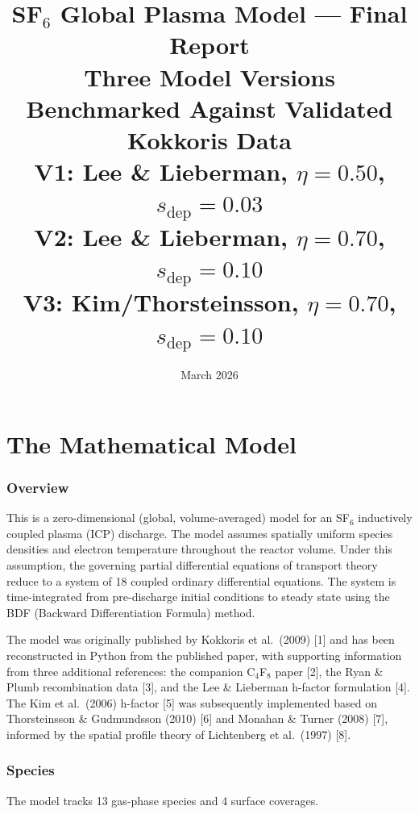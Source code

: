 \documentclass[11pt,a4paper]{article}
\title{\textbf{SF$_6$ Global Plasma Model --- Final Report}\\[6pt]
\large Three Model Versions Benchmarked Against Validated Kokkoris Data\\[4pt]
\normalsize V1: Lee \& Lieberman, $\eta=0.50$, $s_\text{dep}=0.03$\\
V2: Lee \& Lieberman, $\eta=0.70$, $s_\text{dep}=0.10$\\
V3: Kim/Thorsteinsson, $\eta=0.70$, $s_\text{dep}=0.10$}
\date{March 2026}
\begin{document}
\maketitle
\tableofcontents
\newpage

\part{The Mathematical Model}

\section{Overview}

This is a zero-dimensional (global, volume-averaged) model for an SF$_6$ inductively coupled plasma (ICP) discharge. The model assumes spatially uniform species densities and electron temperature throughout the reactor volume. Under this assumption, the governing partial differential equations of transport theory reduce to a system of 18 coupled ordinary differential equations. The system is time-integrated from pre-discharge initial conditions to steady state using the BDF (Backward Differentiation Formula) method.

The model was originally published by Kokkoris et al.\ (2009) [1] and has been reconstructed in Python from the published paper, with supporting information from three additional references: the companion C$_4$F$_8$ paper [2], the Ryan \& Plumb recombination data [3], and the Lee \& Lieberman h-factor formulation [4]. The Kim et al.\ (2006) h-factor [5] was subsequently implemented based on Thorsteinsson \& Gudmundsson (2010) [6] and Monahan \& Turner (2008) [7], informed by the spatial profile theory of Lichtenberg et al.\ (1997) [8].

\section{Species}

The model tracks 13 gas-phase species and 4 surface coverages.
\end{document}

